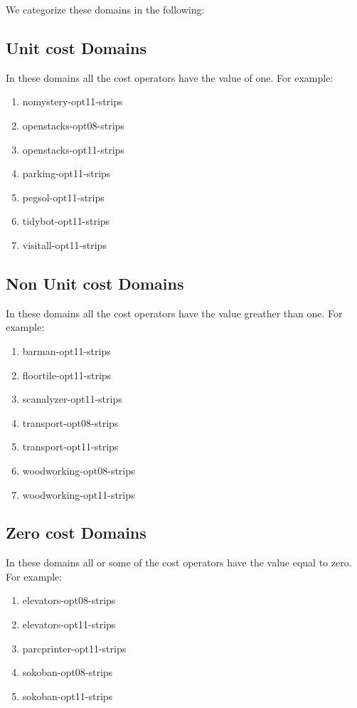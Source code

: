 \documentclass[11pt,a4paper,oneside]{report}
\begin{document}
We categorize these domains in the following:
\subsection{Unit cost Domains}
In these domains all the cost operators have the value of one. For example:
\begin{enumerate}
	\item nomystery-opt11-strips
	\item openstacks-opt08-strips
	\item openstacks-opt11-strips
	\item parking-opt11-strips
	\item pegsol-opt11-strips
	\item tidybot-opt11-strips
	\item visitall-opt11-strips
\end{enumerate}

\subsection{Non Unit cost Domains}
In these domains all the cost operators have the value greather than one. For example:
\begin{enumerate}
	\item barman-opt11-strips
	\item floortile-opt11-strips
	\item scanalyzer-opt11-strips
	\item transport-opt08-strips
	\item transport-opt11-strips
	\item woodworking-opt08-strips
	\item woodworking-opt11-strips
\end{enumerate}

\subsection{Zero cost Domains}
In these domains all or some of the cost operators have the value equal to zero. For example:
\begin{enumerate}
	\item elevators-opt08-strips
	\item elevators-opt11-strips
	\item parcprinter-opt11-strips
	\item sokoban-opt08-strips
	\item sokoban-opt11-strips
\end{enumerate}




\newpage


%
\end{document}
